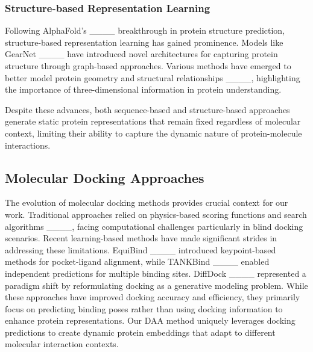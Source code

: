 \subsubsection{Structure-based Representation Learning}
Following AlphaFold's ____ breakthrough in protein structure prediction, structure-based representation learning has gained prominence. Models like GearNet ____ have introduced novel architectures for capturing protein structure through graph-based approaches. Various methods have emerged to better model protein geometry and structural relationships ____, highlighting the importance of three-dimensional information in protein understanding.

Despite these advances, both sequence-based and structure-based approaches generate static protein representations that remain fixed regardless of molecular context, limiting their ability to capture the dynamic nature of protein-molecule interactions.

\subsection{Molecular Docking Approaches}
The evolution of molecular docking methods provides crucial context for our work. Traditional approaches relied on physics-based scoring functions and search algorithms ____, facing computational challenges particularly in blind docking scenarios. Recent learning-based methods have made significant strides in addressing these limitations. EquiBind ____ introduced keypoint-based methods for pocket-ligand alignment, while TANKBind ____ enabled independent predictions for multiple binding sites. DiffDock ____ represented a paradigm shift by reformulating docking as a generative modeling problem. While these approaches have improved docking accuracy and efficiency, they primarily focus on predicting binding poses rather than using docking information to enhance protein representations. Our DAA method uniquely leverages docking predictions to create dynamic protein embeddings that adapt to different molecular interaction contexts.






